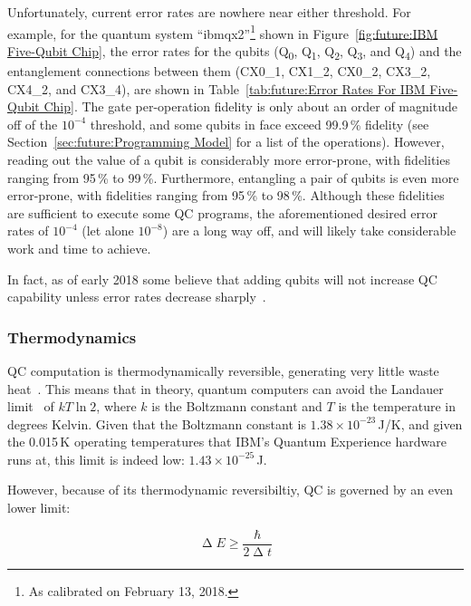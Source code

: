 Unfortunately, current error rates are nowhere near either threshold.
For example, for the quantum system ``ibmqx2''\footnote{
	As calibrated on February 13, 2018.}
shown in
Figure~\ref{fig:future:IBM Five-Qubit Chip},
the error rates for the qubits
(Q\textsubscript{0}, 
Q\textsubscript{1}, 
Q\textsubscript{2}, 
Q\textsubscript{3}, and
Q\textsubscript{4})
and the entanglement connections between them
(CX0\_1,
CX1\_2,
CX0\_2,
CX3\_2,
CX4\_2, and
CX3\_4),
are shown in
Table~\ref{tab:future:Error Rates For IBM Five-Qubit Chip}.
The gate per-operation fidelity is only about an order of magnitude
off of the $10^{-4}$ threshold, and some qubits in face exceed 99.9\,\%
fidelity (see Section~\ref{sec:future:Programming Model} for a list of
the operations).
However, reading out the value of a qubit is considerably more
error-prone, with fidelities ranging from 95\,\% to 99\,\%.
Furthermore, entangling a pair of qubits is even more error-prone,
with fidelities ranging from 95\,\% to 98\,\%.
Although these fidelities are sufficient to execute some QC programs, the
aforementioned desired error rates of $10^{-4}$ (let alone $10^{-8}$) are a
long way off, and will likely take considerable work and time to achieve.

In fact, as of early 2018 some believe that adding qubits will not
increase QC capability unless error rates decrease
sharply~\cite{IBMResearch2018QuantumVolume,TheEconomist2018QualityOverQuantity}.

\subsubsection{Thermodynamics}
\label{sec:future:Thermodynamics}

QC computation is thermodynamically reversible, generating
very little waste heat~\cite{Bennett:1973:LRC:1664562.1664568,RichardFeynman1986QuantumMechanicalComputers}.
This means that in theory, quantum computers can avoid the
Landauer limit~\cite{Landauer:1961:IHG:1661184.1661186}
of $kT \ln 2$, where $k$ is the Boltzmann constant and $T$ is the
temperature in degrees Kelvin.
Given that the Boltzmann constant is $1.38 \times 10^{-23}$\,J/K,
and given the 0.015\,K operating temperatures that IBM's Quantum Experience
hardware runs at, this limit is indeed low: $1.43 \times 10^{-25}$\,J.

However, because of its thermodynamic reversibiltiy,
QC is governed by an even lower limit:

\begin{equation}
	\upDelta E \geq \frac{\hbar}{2 \upDelta t}
\end{equation}

